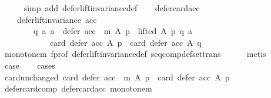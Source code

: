 \begin{isabellebody}
\ \ \ \ \isamarkupfalse%
\ {\isacharparenleft}{\kern0pt}simp\ add{\isacharcolon}{\kern0pt}\ defer{\isacharunderscore}{\kern0pt}lift{\isacharunderscore}{\kern0pt}invariance{\isacharunderscore}{\kern0pt}def{\isacharparenright}{\kern0pt}\isanewline
\ \ \isamarkupfalse%
\ defer{\isacharunderscore}{\kern0pt}card{\isacharunderscore}{\kern0pt}acc{\isacharunderscore}{\kern0pt}{}{\isacharcolon}{\kern0pt}\isanewline
\ \ \ \ {\isachardoublequoteopen}defer{\isacharunderscore}{\kern0pt}lift{\isacharunderscore}{\kern0pt}invariance\ acc\ {\isasymlongrightarrow}\isanewline
\ \ \ \ \ \ \ \ {\isacharparenleft}{\kern0pt}{\isasymforall}q\ a{\isachardot}{\kern0pt}\ {\isacharparenleft}{\kern0pt}a\ {\isasymin}\ {\isacharparenleft}{\kern0pt}defer\ {\isacharparenleft}{\kern0pt}acc\ {\isasymtriangleright}\ m{\isacharparenright}{\kern0pt}\ A\ p{\isacharparenright}{\kern0pt}\ {\isasymand}\ lifted\ A\ p\ q\ a{\isacharparenright}{\kern0pt}\ {\isasymlongrightarrow}\isanewline
\ \ \ \ \ \ \ \ \ \ \ \ card\ {\isacharparenleft}{\kern0pt}defer\ {\isacharparenleft}{\kern0pt}acc{\isacharparenright}{\kern0pt}\ A\ p{\isacharparenright}{\kern0pt}\ {\isacharequal}{\kern0pt}\ card\ {\isacharparenleft}{\kern0pt}defer\ {\isacharparenleft}{\kern0pt}acc{\isacharparenright}{\kern0pt}\ A\ q{\isacharparenright}{\kern0pt}{\isacharparenright}{\kern0pt}{\isachardoublequoteclose}\isanewline
\ \ \ \ \isamarkupfalse%
\ monotone{\isacharunderscore}{\kern0pt}m\ f{\isacharunderscore}{\kern0pt}prof\ defer{\isacharunderscore}{\kern0pt}lift{\isacharunderscore}{\kern0pt}invariance{\isacharunderscore}{\kern0pt}def\ seq{\isacharunderscore}{\kern0pt}comp{\isacharunderscore}{\kern0pt}def{\isacharunderscore}{\kern0pt}set{\isacharunderscore}{\kern0pt}trans\isanewline
\ \ \ \ \isamarkupfalse%
\ metis\isanewline
\ \ \isamarkupfalse%
\ {\isacharquery}{\kern0pt}case\isanewline
\ \ \isamarkupfalse%
\ cases\isanewline
\ \ \ \ \isamarkupfalse%
\ card{\isacharunderscore}{\kern0pt}unchanged{\isacharcolon}{\kern0pt}\ {\isachardoublequoteopen}card\ {\isacharparenleft}{\kern0pt}defer\ {\isacharparenleft}{\kern0pt}acc\ {\isasymtriangleright}\ m{\isacharparenright}{\kern0pt}\ A\ p{\isacharparenright}{\kern0pt}\ {\isacharequal}{\kern0pt}\ card\ {\isacharparenleft}{\kern0pt}defer\ acc\ A\ p{\isacharparenright}{\kern0pt}{\isachardoublequoteclose}\isanewline
\ \ \ \ \isamarkupfalse%
\ defer{\isacharunderscore}{\kern0pt}card{\isacharunderscore}{\kern0pt}comp\ defer{\isacharunderscore}{\kern0pt}card{\isacharunderscore}{\kern0pt}acc\ monotone{\isacharunderscore}{\kern0pt}m\isanewline

\end{isabellebody}
